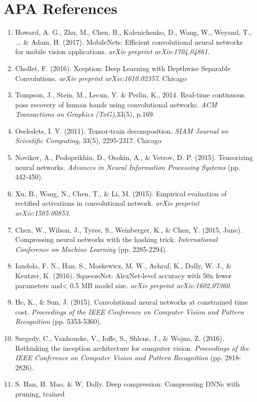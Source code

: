 \documentclass{article}
\begin{document}
{\section*{APA References}
\begin{enumerate}
\item Howard, A. G., Zhu, M., Chen, B., Kalenichenko, D., Wang, W., Weyand, T., ... \& Adam, H. (2017). MobileNets: Efficient convolutional neural networks for mobile vision applications. \emph{arXiv preprint arXiv:1704.04861}.
\item Chollet, F. (2016). Xception: Deep Learning with Depthwise Separable Convolutions. \emph{arXiv preprint arXiv:1610.02357}.
Chicago	
\item Tompson, J., Stein, M., Lecun, Y. \& Perlin, K., 2014. Real-time continuous pose recovery of human hands using convolutional networks. \emph{ACM Transactions on Graphics (ToG)},33(5), p.169.
\item Oseledets, I. V. (2011). Tensor-train decomposition. \emph{SIAM Journal on Scientific Computing}, 33(5), 2295-2317.
Chicago	
\item Novikov, A., Podoprikhin, D., Osokin, A., \& Vetrov, D. P. (2015). Tensorizing neural networks. \emph{Advances in Neural Information Processing Systems} (pp. 442-450).
\item Xu, B., Wang, N., Chen, T., \& Li, M. (2015). Empirical evaluation of rectified activations in convolutional network. \emph{arXiv preprint arXiv:1505.00853}.
\item Chen, W., Wilson, J., Tyree, S., Weinberger, K., \& Chen, Y. (2015, June). Compressing neural networks with the hashing trick. \emph{International Conference on Machine Learning} (pp. 2285-2294).
\item Iandola, F. N., Han, S., Moskewicz, M. W., Ashraf, K., Dally, W. J., \& Keutzer, K. (2016). SqueezeNet: AlexNet-level accuracy with 50x fewer parameters and< 0.5 MB model size. \emph{arXiv preprint arXiv:1602.07360}.
\item He, K., \& Sun, J. (2015). Convolutional neural networks at constrained time cost. \emph{Proceedings of the IEEE Conference on Computer Vision and Pattern Recognition} (pp. 5353-5360).
\item Szegedy, C., Vanhoucke, V., Ioffe, S., Shlens, J., \& Wojna, Z. (2016). Rethinking the inception architecture for computer vision. \emph{Proceedings of the IEEE Conference on Computer Vision and Pattern Recognition} (pp. 2818-2826).
\item S. Han, H. Mao, \& W. Dally. Deep compression: Compressing DNNs with pruning, trained

\end{enumerate}}
\end{document}
